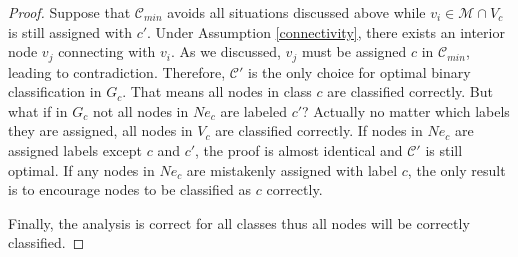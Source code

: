 \begin{proof}
Suppose that $\mathcal{C}_{min}$ avoids all situations discussed above while $v_i \in \mathcal{M}\cap V_c$ is still assigned with $c'$. Under Assumption \ref{connectivity}, there exists an interior node $v_j$ connecting with $v_i$. As we discussed, $v_j$ must be assigned $c$ in $\mathcal{C}_{min}$, leading to contradiction. 
%
Therefore, $\mathcal{C}'$ is the only choice for optimal binary classification in $G_c$. That means all nodes in class $c$ are classified correctly. But what if in $G_c$ not all nodes in $Ne_c$ are labeled $c'$? 
%
Actually no matter which labels they are assigned, all nodes in $V_c$ are classified correctly. If nodes in $Ne_c$ are assigned labels except $c$ and $c'$, the proof is almost identical and $\mathcal{C}'$ is still optimal. If any nodes in $Ne_c$ are mistakenly assigned with label $c$, the only result is to encourage nodes to be classified as $c$ correctly. 

Finally, the analysis is correct for all classes thus all nodes will be correctly classified.
\end{proof}